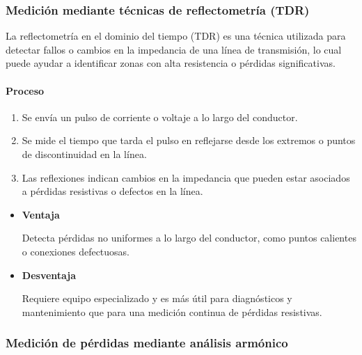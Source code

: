         \subsubsection{Medición mediante técnicas de reflectometría (TDR)}

            La reflectometría en el dominio del tiempo (TDR) es una técnica utilizada para detectar fallos o cambios en la impedancia de una línea de transmisión, lo cual puede ayudar a identificar zonas con alta resistencia o pérdidas significativas.

            \paragraph{Proceso}

                \begin{enumerate}
                    \item Se envía un pulso de corriente o voltaje a lo largo del conductor.
                    
                    \item Se mide el tiempo que tarda el pulso en reflejarse desde los extremos o puntos de discontinuidad en la línea.
                    
                    \item Las reflexiones indican cambios en la impedancia que pueden estar asociados a pérdidas resistivas o defectos en la línea.
                \end{enumerate}

            \begin{itemize}
                \item \textbf{Ventaja}

                    Detecta pérdidas no uniformes a lo largo del conductor, como puntos calientes o conexiones defectuosas.
                    
                \item \textbf{Desventaja}

                    Requiere equipo especializado y es más útil para diagnósticos y mantenimiento que para una medición continua de pérdidas resistivas.
            \end{itemize}

        \subsubsection{Medición de pérdidas mediante análisis armónico}

